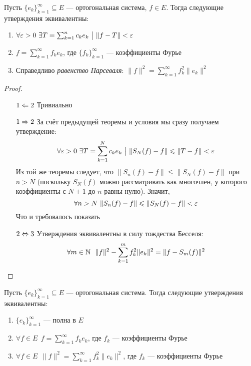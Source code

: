 \begin{theorem}
	Пусть $\{e_k\}_{k = 1}^\infty \subseteq E$ --- ортогональная система, $f \in E$. Тогда следующие утверждения эквивалентны:
	\begin{enumerate}
		\item $\forall \varepsilon > 0\ \exists T = \sum_{k = 1}^n c_ke_k \ \big|\  \|f - T\| < \varepsilon$
		
		\item $f = \sum_{k = 1}^\infty f_ke_k$, где $\{f_k\}_{k = 1}^\infty$ --- коэффициенты Фурье
		
		\item Справедливо \textit{равенство Парсеваля}: $\|f\|^2 = \sum_{k = 1}^\infty f_k^2\|e_k\|^2$
	\end{enumerate}
\end{theorem}

\begin{proof}~
	\begin{itemize}
		\item[$1 \Leftarrow 2$] Тривиально
		
		\item[$1 \Rightarrow 2$] За счёт предыдущей теоремы и условия мы сразу получаем утверждение:
		\[
			\forall \varepsilon > 0\ \exists T = \sum_{k = 1}^N c_ke_k \ \big|\  \|S_N(f) - f\| \leqslant \|T - f\| < \varepsilon
		\]
		Из той же теоремы следует, что $\|S_n(f) - f\| \leq \|S_N(f) - f\|$ при $n > N$ (поскольку $S_N(f)$ можно рассматривать как многочлен, у которого коэффициенты с $N+1$ до $n$ равны нулю). Значит,
		\[
			\forall n > N \ \|S_n(f) - f\| \le \|S_N(f) - f\| < \eps
		\]
		Что и требовалось показать
		
		\item[$2 \Leftrightarrow 3$] Утверждения эквивалентны в силу тождества Бесселя:
		\[
			\forall m \in \mathbb{N}\ \ \|f\|^2 - \sum_{k = 1}^m f_k^2\|e_k\|^2 = \|f - S_m(f)\|^2
		\]
	\end{itemize}
\end{proof}

\begin{corollary}
	Пусть $\{e_k\}_{k = 1}^\infty \subseteq E$ --- ортогональная система. Тогда следующие утверждения эквивалентны:
	\begin{enumerate}
		\item $\{e_k\}_{k = 1}^\infty$ --- полна в $E$
		
		\item $\forall f \in E\ \ f = \sum_{k = 1}^\infty f_ke_k$, где $f_k$ --- коэффициенты Фурье
		
		\item $\forall f \in E\ \ \|f\|^2 = \sum_{k = 1}^\infty f_k^2\|e_k\|^2$, где $f_k$ --- коэффициенты Фурье
	\end{enumerate}
\end{corollary}


